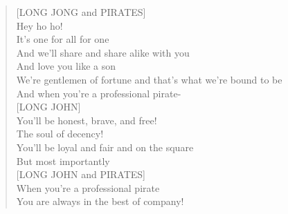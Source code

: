 \documentclass[11pt]{article}
\begin{document}
\begin{verse}
[LONG JONG and PIRATES]\\
Hey ho ho!\\
It's one for all for one\\
And we'll share and share alike with you\\
And love you like a son\\
We're gentlemen of fortune and that's what we're bound to be\\
And when you're a professional pirate-\\
\vspace*{1em}
[LONG JOHN]\\
You'll be honest, brave, and free!\\
The soul of decency!\\
You'll be loyal and fair and on the square\\
But most importantly\\
\vspace*{1em}
[LONG JOHN and PIRATES]\\
When you're a professional pirate\\
You are always in the best of company!\\
\end{verse}
\clearpage
\end{document}
